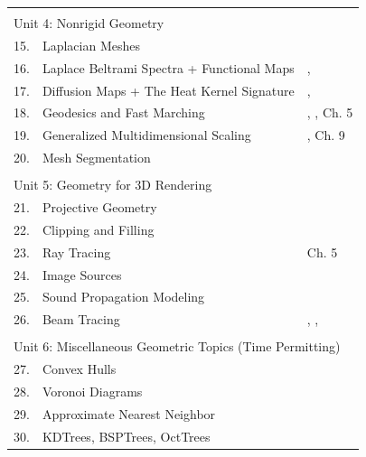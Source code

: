 \documentclass{article}
\begin{document}
\begin{tabular}{ | l | l | l | }
  \multicolumn{3}{l}{ } \\        
  \multicolumn{3}{l}{\Large Unit 4: Nonrigid Geometry} \\ \hline 
    15. & Laplacian Meshes &  \cite{sorkine2006laplacian} \\ \hline       
  	16. & Laplace Beltrami Spectra + Functional Maps &  \cite{ovsjanikov2012functional}, \cite{Rustamov2013} \\ \hline
  	17. & Diffusion Maps + The Heat Kernel Signature & \cite{sun2009concise}, \cite{Mahmoudi2009} \\ \hline
  	18. & Geodesics and Fast Marching & \cite{kimmel1998computing}, \cite{Memoli2005}, \cite{Bronstein2008} Ch. 5\\ \hline
  	19. & Generalized Multidimensional Scaling & \cite{bronstein2006generalized}, \cite{Bronstein2008} Ch. 9 \\ \hline
  	20. & Mesh Segmentation & \\ \hline
  	
  \multicolumn{3}{l}{ } \\        
  \multicolumn{3}{l}{\Large Unit 5: Geometry for 3D Rendering} \\ \hline 
    21. & Projective Geometry &  \\ \hline       
  	22. & Clipping and Filling & \cite{sutherland1974reentrant}  \\ \hline
  	23. & Ray Tracing & \cite{lengyel2012mathematics} Ch. 5 \\ \hline
  	24. & Image Sources & \cite{rindel2000use} \\ \hline
	25. & Sound Propagation Modeling & \\ \hline
  	26. & Beam Tracing &  \cite{heckbert1984beam}, \cite{funkhouser1998beam}, \cite{overbeck2007real} \\ \hline	

  \multicolumn{3}{l}{ } \\        
  \multicolumn{3}{l}{\Large Unit 6: Miscellaneous Geometric Topics (Time Permitting)} \\ \hline 
    27. & Convex Hulls &  \\ \hline       
  	28. & Voronoi Diagrams &   \\ \hline
  	29. & Approximate Nearest Neighbor & \\ \hline
  	30. & KDTrees, BSPTrees, OctTrees &  \\ \hline
 
\end{tabular}
\end{document}

